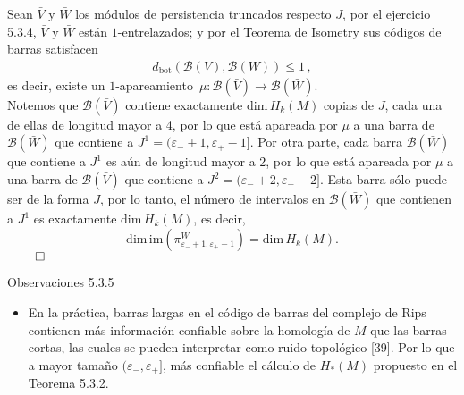 \documentclass{beamer}
\def\matching{apareamiento}
\begin{document}
\begin{frame}
Sean $\bar{V}$ y $\bar{W}$ los m\'odulos de persistencia truncados respecto $J$, por el ejercicio 5.3.4, $\bar{V}$ y $\bar{W}$ est\'an $1$-entrelazados; y por el Teorema de Isometry sus c\'odigos de barras satisfacen
\begin{gather*}
d_{\mbox{bot}}\left( \mathcal{B}(V),\mathcal{B}(W)\right)\leq 1\,,
\end{gather*}
es decir, existe un $1$-\matching~$\mu:\mathcal{B}(\bar{V})\rightarrow\mathcal{B}(\bar{W})$.\\

Notemos que $\mathcal{B}(\bar{V})$ contiene exactamente $\mbox{dim}\,H_k(M)$ copias de $J$, cada una de ellas de longitud mayor a 4, por lo que est\'a apareada por $\mu$ a una barra de $\mathcal{B}(\bar{W})$ que contiene a $J^1=(\varepsilon_{-}+1,\varepsilon_{+}-1]$. Por otra parte, cada barra $\mathcal{B}(\bar{W})$ que contiene a $J^1$ es a\'un de longitud mayor a 2, por lo que est\'a apareada por $\mu$ a una barra de $\mathcal{B}(\bar{V})$ que contiene a $J^2=(\varepsilon_{-}+2,\varepsilon_{+}-2]$. Esta barra s\'olo puede ser de la forma $J$, por lo tanto, el n\'umero de intervalos en $\mathcal{B}(\bar{W})$ que contienen a $J^1$ es exactamente $\mbox{dim}\,H_{k}(M)$, es decir, $$\mbox{dim}\,\mbox{im}(\pi_{\varepsilon_{-}+1,\varepsilon_{+}-1}^{W})=\mbox{dim}\,H_{k}(M).$$
$\,$\hfill $\qed$
\end{frame}

\begin{frame}{Observaciones 5.3.5}
\begin{itemize}
\item En la pr\'actica, barras largas en el c\'odigo de barras del complejo de Rips contienen m\'as informaci\'on confiable sobre la homolog\'ia de $M$ que las barras cortas, las cuales se pueden interpretar como ruido topol\'ogico [39]. Por lo que a mayor tama\~no $(\varepsilon_{-},\varepsilon_{+}]$, m\'as confiable el c\'alculo de $H_{\ast}(M)$ propuesto en el Teorema 5.3.2.
\end{itemize}
\vspace{2em}
\end{frame}
\end{document}
